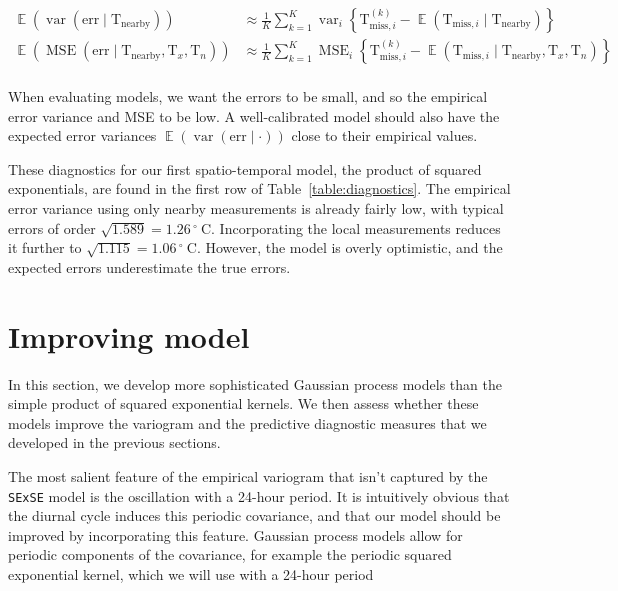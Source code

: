\documentclass[letter]{article}
\newcommand{\genericdel}[3]{%
      \left#1#3\right#2
    }
\newcommand{\del}[1]{\genericdel(){#1}}
\newcommand{\cbr}[1]{\genericdel\{\}{#1}}
\DeclareMathOperator{\E}{\mathbb{E}}
\DeclareMathOperator{\var}{{var}}
\DeclareMathOperator{\mse}{{MSE}}
\newcommand{\T}{\mathrm{T}}
\newcommand{\Tn}{\T_{n}}
\newcommand{\Tx}{\T_{x}}
\newcommand{\degreeC}{{}^{\circ}~\mathrm{C}}
\newcommand{\miss}{\mathrm{miss}}
\newcommand{\obs}{\mathrm{nearby}}
\newcommand{\error}{\mathrm{err}}
\begin{document}
\begin{equation}
\begin{split}
    \E \del{\var\del{\error \mid \T_\obs}} &\approx \frac{1}{K} \sum_{k=1}^K \var_i \cbr{\T^{(k)}_{\miss,i} - \E\del{\T_{\miss,i} \mid \T_\obs}} \\
    \E \del{\mse\del{\error \mid \T_\obs,\Tx,\Tn}} &\approx \frac{1}{K} \sum_{k=1}^K \mse_i \cbr{\T^{(k)}_{\miss,i} - \E\del{\T_{\miss,i} \mid \T_\obs,\Tx,\Tn}} \\
\end{split}
\end{equation}

When evaluating models, we want the errors to be small, and so the empirical error variance and MSE to be low. A well-calibrated model should also have the expected error variances \(\E \del{\var\del{\error \mid \cdot}}\) close to their empirical values.

These diagnostics for our first spatio-temporal model, the product of squared exponentials, are found in the first row of Table~\ref{table:diagnostics}. The empirical error variance using only nearby measurements is already fairly low, with typical errors of order \(\sqrt{1.589}=1.26\,\degreeC\). Incorporating the local measurements reduces it further to \(\sqrt{1.115}=1.06\,\degreeC\). However, the model is overly optimistic, and the expected errors underestimate the true errors.
    


        \section{Improving model}\label{improving-model}
    

\label{sec:improving_model}
        In this section, we develop more sophisticated Gaussian process models than the simple product of squared exponential kernels. We then assess whether these models improve the variogram and the predictive diagnostic measures that we developed in the previous sections.

The most salient feature of the empirical variogram that isn't captured by the \texttt{SExSE} model is the oscillation with a 24-hour period. It is intuitively obvious that the diurnal cycle induces this periodic covariance, and that our model should be improved by incorporating this feature. Gaussian process models allow for periodic components of the covariance, for example the periodic squared exponential kernel, which we will use with a 24-hour period
\end{document}

